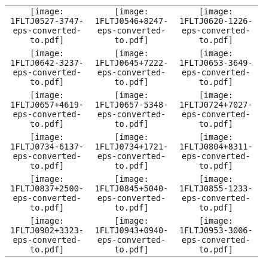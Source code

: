 \begin{figure}[!t]
	\centering            
	\ContinuedFloat 
\setlength\tabcolsep{0.0pt}
\begin{tabular}{ccc} 
  \texttt{[image: 1FLTJ0527-3747-eps-converted-to.pdf]}\label{fig:1FLTJ0527-3747}&
  \texttt{[image: 1FLTJ0546+8247-eps-converted-to.pdf]}\label{fig:1FLTJ0546+8247}&
  \texttt{[image: 1FLTJ0620-1226-eps-converted-to.pdf]}\label{fig:1FLTJ0620-1226}\\
  \texttt{[image: 1FLTJ0642-3237-eps-converted-to.pdf]}\label{fig:1FLTJ0642-3237}&
  \texttt{[image: 1FLTJ0645+7222-eps-converted-to.pdf]}\label{fig:1FLTJ0645+7222}&
  \texttt{[image: 1FLTJ0653-3649-eps-converted-to.pdf]}\label{fig:1FLTJ0653-3649}\\
  \texttt{[image: 1FLTJ0657+4619-eps-converted-to.pdf]}\label{fig:1FLTJ0657+4619}&
  \texttt{[image: 1FLTJ0657-5348-eps-converted-to.pdf]}\label{fig:1FLTJ0657-5348}&
  \texttt{[image: 1FLTJ0724+7027-eps-converted-to.pdf]}\label{fig:1FLTJ0724+7027}\\
  \texttt{[image: 1FLTJ0734-6137-eps-converted-to.pdf]}\label{fig:1FLTJ0734-6137}&
  \texttt{[image: 1FLTJ0734+1721-eps-converted-to.pdf]}\label{fig:1FLTJ0734+1721}&
  \texttt{[image: 1FLTJ0804+8311-eps-converted-to.pdf]}\label{fig:1FLTJ0804+8311}\\
  \texttt{[image: 1FLTJ0837+2500-eps-converted-to.pdf]}\label{fig:1FLTJ0837+2500}&
  \texttt{[image: 1FLTJ0845+5040-eps-converted-to.pdf]}\label{fig:1FLTJ0845+5040}&
  \texttt{[image: 1FLTJ0855-1233-eps-converted-to.pdf]}\label{fig:1FLTJ0855-1233}\\
  \texttt{[image: 1FLTJ0902+3323-eps-converted-to.pdf]}\label{fig:1FLTJ0902+3323}&
  \texttt{[image: 1FLTJ0943+0940-eps-converted-to.pdf]}\label{fig:1FLTJ0943+0940}&
  \texttt{[image: 1FLTJ0953-3006-eps-converted-to.pdf]}\label{fig:1FLTJ0953-3006}\\
\end{tabular}
\end{figure}
